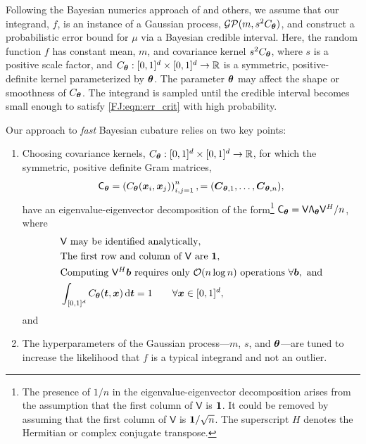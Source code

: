 \documentclass[graybox,footinfo]{svmult}
\begin{document}
Following the Bayesian numerics approach of \cite{BriEtal18a, Dia88a, OHa91a, RasGha03a} and others, we assume that our integrand, $f$, is an instance of a Gaussian process, $\mathcal{GP}(m,s^2 C_{\boldsymbol{\theta}})$, and construct a probabilistic error bound for $\mu$ via a Bayesian credible interval. 
Here, the random function $f$ has constant mean, $m$, and covariance kernel $s^2C_{\boldsymbol{\theta}}$, where $s$ is a positive scale factor, and $C_{\boldsymbol{\theta}}: [0,1]^d \times [0,1]^d \to \mathbb{R} $ is a symmetric, positive-definite kernel parameterized by ${\boldsymbol{\theta}}$.   The parameter ${\boldsymbol{\theta}}$ may affect the shape or smoothness of $C_{\boldsymbol{\theta}}$.  
The integrand is sampled until the credible interval becomes small enough to satisfy \eqref{FJ:eqn:err_crit} with high probability.  

Our approach to \emph{fast} Bayesian cubature \cite{RatHic19a} relies on two key points:
\begin{enumerate}
\renewcommand{\labelenumi}{\roman{enumi})}
    \item Choosing covariance kernels, $C_{\boldsymbol{\theta}}:[0,1]^d \times [0,1]^d \to {\mathbb{R}}$, for which the symmetric, positive definite Gram matrices, 
    \begin{equation} \label{FJ:eq:Gram}
        \mathsf{C}_\bstheta = \left(  C_\bstheta(\bsx_i,\bsx_j)  \right)_{i,j=1}^n, = (\bsC_{\bstheta,1}, \ldots, \bsC_{\bstheta,n}),
    \end{equation}
    have an eigenvalue-eigenvector decomposition of the form\footnote{The presence of $1/n$ in the eigenvalue-eigenvector decomposition arises from the assumption that the first column of $\mathsf{V}$ is ${\boldsymbol{1}}$.  It could be removed by assuming that the first column of $\mathsf{V}$ is ${\boldsymbol{1}}/\sqrt{n}$.  The superscript $H$ denotes the Hermitian or complex conjugate transpose.} $\mathsf{C}_{\boldsymbol{\theta}} = \mathsf{V} \mathsf{\Lambda}_{\boldsymbol{\theta}} \mathsf{V}^H/n$, where
    \begin{subequations} \label{FJ:eq:fastcompAssump}
	\begin{align}
	\label{FJ:eq:fastcompAssumpA}
	& \mathsf{V} \text{ may be identified analytically}, \\
	\label{FJ:eq:fastcompAssumpB}
	&\text{The first row and column of $\mathsf{V}$ are } \bsone, \\
	\label{FJ:eq:fastcompAssumpC}
	& \text{Computing $\mathsf{V}^H \bsb$ requires only $\calO(n \log n)$ operations } \forall \bsb, \text{ and} \\
	\label{FJ:addAssump}
    & \int_{[0,1]^d} C_\bstheta(\bst,\bsx) \, \D \bst = 1 \qquad \forall \bsx \in [0,1]^d,
	\end{align}
\end{subequations}
and
\item The hyperparameters of the Gaussian process---$m$, $s$, and ${\boldsymbol{\theta}}$---are tuned to increase the likelihood that $f$ is a typical integrand and not an outlier.
\end{enumerate}
\end{document}

